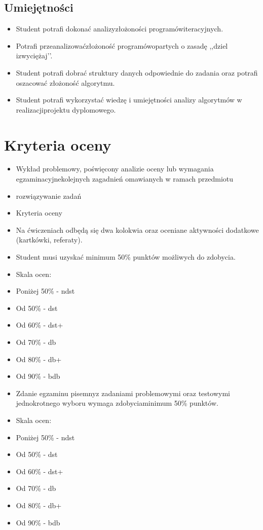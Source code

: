\documentclass[12pt, a4paper]{article}
\begin{document}
\subsection*{Umiejętności}
\begin{itemize}
  \item Student potrafi dokonać analizyzłożoności programówiteracyjnych.
  \item Potrafi przeanalizowaćzłożoność programówopartych o zasadę ,,dziel izwyciężaj’’.
  \item Student potrafi dobrać struktury danych odpowiednie do zadania oraz potrafi oszacować złożoność algorytmu.
  \item Student potrafi wykorzystać wiedzę i umiejętności analizy algorytmów w realizacjiprojektu dyplomowego.
\end{itemize}

\section{Kryteria oceny}

\begin{itemize}
  \item Wykład problemowy, poświęcony analizie oceny lub wymagania egzaminacyjnekolejnych zagadnień omawianych w ramach przedmiotu
  \item rozwiązywanie zadań
  \item Kryteria oceny
  \item Na ćwiczeniach odbędą się dwa kolokwia oraz oceniane aktywności dodatkowe (kartkówki, referaty).
  \item Student musi uzyskać minimum 50\% punktów możliwych do zdobycia.
  \item Skala ocen:
  \item Poniżej 50\% - ndst
  \item Od 50\% - dst
  \item Od 60\% - dst+
  \item Od 70\% - db
  \item Od 80\% - db+
  \item Od 90\% - bdb
  \item Zdanie egzaminu pisemnyz zadaniami problemowymi oraz testowymi jednokrotnego wyboru wymaga zdobyciaminimum 50\% punktów.
  \item Skala ocen:
  \item Poniżej 50\% - ndst
  \item Od 50\% - dst
  \item Od 60\% - dst+
  \item Od 70\% - db
  \item Od 80\% - db+
  \item Od 90\% - bdb
\end{itemize}
\end{document}
